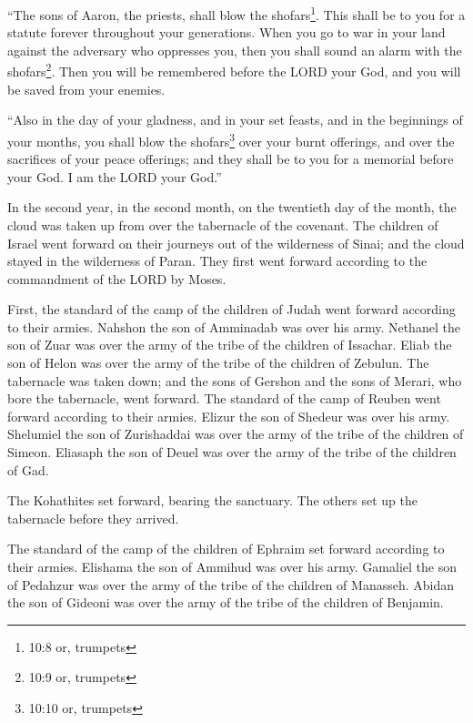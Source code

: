 \myverse{}“The sons of Aaron, the priests, shall blow the shofars\footnote{ 10:8 or, trumpets}.
This shall be to you for a statute forever throughout your generations.
\myverse{}When you go to war in your land against the adversary who oppresses you, then
you shall sound an alarm with the shofars\footnote{ 10:9 or, trumpets}. Then you will be remembered before
the LORD your God, and you will be saved from your enemies.


\myverse{}“Also in the day of your gladness, and in your set feasts, and
in the beginnings of your months, you shall blow the shofars\footnote{ 10:10 or, trumpets} over your burnt
offerings, and over the sacrifices of your peace offerings; and they shall be to you for a memorial before
your God. I am the LORD your God.”


\myverse{}In the second year, in the second month, on the twentieth day
of the month, the cloud was taken up from over the tabernacle of the covenant.
\myverse{}The children of Israel went forward on their journeys out of the wilderness
of Sinai; and the cloud stayed in the wilderness of Paran.
\myverse{}They first went forward according to the commandment of the LORD by Moses.


\myverse{}First, the standard of the camp of the children of Judah went
forward according to their armies. Nahshon the son of Amminadab was over his army.
\myverse{}Nethanel the son of Zuar was over the army of the tribe of the children of
Issachar.
\myverse{}Eliab the son of Helon was over the army of the tribe of the children of
Zebulun.
\myverse{}The tabernacle was taken down; and the sons of Gershon and the sons of Merari,
who bore the tabernacle, went forward.
\myverse{}The standard of the camp of Reuben went forward according to their armies.
Elizur the son of Shedeur was over his army.
\myverse{}Shelumiel the son of Zurishaddai was over the army of the tribe of the children
of Simeon.
\myverse{}Eliasaph the son of Deuel was over the army of the tribe of the children
of Gad.


\myverse{}The Kohathites set forward, bearing the sanctuary. The others
set up the tabernacle before they arrived.


\myverse{}The standard of the camp of the children of Ephraim set forward
according to their armies. Elishama the son of Ammihud was over his army.
\myverse{}Gamaliel the son of Pedahzur was over the army of the tribe of the children
of Manasseh.
\myverse{}Abidan the son of Gideoni was over the army of the tribe of the children
of Benjamin.


